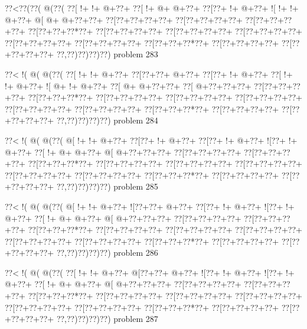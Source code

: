 \vbox{\vbox{\goo
\0??<\0??(\0??(\- @(\0??(
\0??[\- !+\- !+\- @+\0??+
\0??[\- !+\- @+\- @+\0??+
\0??[\0??+\- !+\- @+\0??+
\- ![\- !+\- !+\- @+\0??+
\- @[\- @+\- @+\0??+\0??+
\0??[\0??+\0??+\0??+\0??+
\0??[\0??+\0??+\0??+\0??+
\0??[\0??+\0??+\0??+\0??+
\0??[\0??+\0??+\0??*\0??+
\0??[\0??+\0??+\0??+\0??+
\0??[\0??+\0??+\0??+\0??+
\0??[\0??+\0??+\0??+\0??+
\0??[\0??+\0??+\0??+\0??+
\0??[\0??+\0??+\0??+\0??+
\0??[\0??+\0??+\0??*\0??+
\0??[\0??+\0??+\0??+\0??+
\0??[\0??+\0??+\0??+\0??+
\0??,\0??)\0??)\0??)\0??)
}
\hfil problem 283\hfil\break
}

\vbox{\vbox{\goo
\0??<\- !(\- @(\- @(\0??(
\0??[\- !+\- !+\- @+\0??+
\0??[\0??+\0??+\- @+\0??+
\0??[\0??+\- !+\- @+\0??+
\0??[\- !+\- !+\- @+\0??+
\- ![\- @+\- !+\- @+\0??+
\0??[\- @+\- @+\0??+\0??+
\0??[\- @+\0??+\0??+\0??+
\0??[\0??+\0??+\0??+\0??+
\0??[\0??+\0??+\0??*\0??+
\0??[\0??+\0??+\0??+\0??+
\0??[\0??+\0??+\0??+\0??+
\0??[\0??+\0??+\0??+\0??+
\0??[\0??+\0??+\0??+\0??+
\0??[\0??+\0??+\0??+\0??+
\0??[\0??+\0??+\0??*\0??+
\0??[\0??+\0??+\0??+\0??+
\0??[\0??+\0??+\0??+\0??+
\0??,\0??)\0??)\0??)\0??)
}
\hfil problem 284\hfil\break
}

\vbox{\vbox{\goo
\0??<\- !(\- @(\- @(\0??(
\- @[\- !+\- !+\- @+\0??+
\0??[\0??+\- !+\- @+\0??+
\0??[\0??+\- !+\- @+\0??+
\- ![\0??+\- !+\- @+\0??+
\0??[\- !+\- @+\- @+\0??+
\- @[\- @+\0??+\0??+\0??+
\0??[\0??+\0??+\0??+\0??+
\0??[\0??+\0??+\0??+\0??+
\0??[\0??+\0??+\0??*\0??+
\0??[\0??+\0??+\0??+\0??+
\0??[\0??+\0??+\0??+\0??+
\0??[\0??+\0??+\0??+\0??+
\0??[\0??+\0??+\0??+\0??+
\0??[\0??+\0??+\0??+\0??+
\0??[\0??+\0??+\0??*\0??+
\0??[\0??+\0??+\0??+\0??+
\0??[\0??+\0??+\0??+\0??+
\0??,\0??)\0??)\0??)\0??)
}
\hfil problem 285\hfil\break
}

\vbox{\vbox{\goo
\0??<\- !(\- @(\- @(\0??(
\- @[\- !+\- !+\- @+\0??+
\- ![\0??+\0??+\- @+\0??+
\0??[\0??+\- !+\- @+\0??+
\- ![\0??+\- !+\- @+\0??+
\0??[\- !+\- @+\- @+\0??+
\- @[\- @+\0??+\0??+\0??+
\0??[\0??+\0??+\0??+\0??+
\0??[\0??+\0??+\0??+\0??+
\0??[\0??+\0??+\0??*\0??+
\0??[\0??+\0??+\0??+\0??+
\0??[\0??+\0??+\0??+\0??+
\0??[\0??+\0??+\0??+\0??+
\0??[\0??+\0??+\0??+\0??+
\0??[\0??+\0??+\0??+\0??+
\0??[\0??+\0??+\0??*\0??+
\0??[\0??+\0??+\0??+\0??+
\0??[\0??+\0??+\0??+\0??+
\0??,\0??)\0??)\0??)\0??)
}
\hfil problem 286\hfil\break
}

\vbox{\vbox{\goo
\0??<\- !(\- @(\- @(\0??(
\0??[\- !+\- !+\- @+\0??+
\- @[\0??+\0??+\- @+\0??+
\- ![\0??+\- !+\- @+\0??+
\- ![\0??+\- !+\- @+\0??+
\0??[\- !+\- @+\- @+\0??+
\- @[\- @+\0??+\0??+\0??+
\0??[\0??+\0??+\0??+\0??+
\0??[\0??+\0??+\0??+\0??+
\0??[\0??+\0??+\0??*\0??+
\0??[\0??+\0??+\0??+\0??+
\0??[\0??+\0??+\0??+\0??+
\0??[\0??+\0??+\0??+\0??+
\0??[\0??+\0??+\0??+\0??+
\0??[\0??+\0??+\0??+\0??+
\0??[\0??+\0??+\0??*\0??+
\0??[\0??+\0??+\0??+\0??+
\0??[\0??+\0??+\0??+\0??+
\0??,\0??)\0??)\0??)\0??)
}
\hfil problem 287\hfil\break
}

